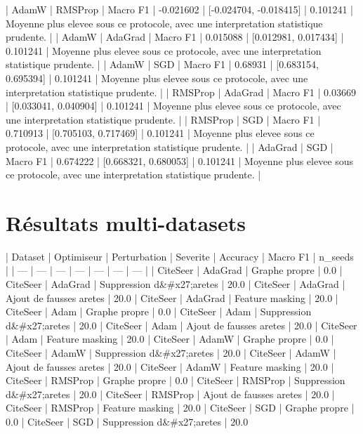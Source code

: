 \documentclass[11pt,a4paper]{article}
\begin{document}
| AdamW | RMSProp | Macro F1 | -0.021602 | [-0.024704, -0.018415] | 0.101241 | Moyenne plus elevee sous ce protocole, avec une interpretation statistique prudente. |
| AdamW | AdaGrad | Macro F1 | 0.015088 | [0.012981, 0.017434] | 0.101241 | Moyenne plus elevee sous ce protocole, avec une interpretation statistique prudente. |
| AdamW | SGD | Macro F1 | 0.68931 | [0.683154, 0.695394] | 0.101241 | Moyenne plus elevee sous ce protocole, avec une interpretation statistique prudente. |
| RMSProp | AdaGrad | Macro F1 | 0.03669 | [0.033041, 0.040904] | 0.101241 | Moyenne plus elevee sous ce protocole, avec une interpretation statistique prudente. |
| RMSProp | SGD | Macro F1 | 0.710913 | [0.705103, 0.717469] | 0.101241 | Moyenne plus elevee sous ce protocole, avec une interpretation statistique prudente. |
| AdaGrad | SGD | Macro F1 | 0.674222 | [0.668321, 0.680053] | 0.101241 | Moyenne plus elevee sous ce protocole, avec une interpretation statistique prudente. |
\par
\section{Résultats multi-datasets}
\par
| Dataset | Optimiseur | Perturbation | Severite | Accuracy | Macro F1 | n_seeds |
| --- | --- | --- | --- | --- | --- | --- |
| CiteSeer | AdaGrad | Graphe propre | 0.0%
| CiteSeer | AdaGrad | Suppression d&#x27;aretes | 20.0%
| CiteSeer | AdaGrad | Ajout de fausses aretes | 20.0%
| CiteSeer | AdaGrad | Feature masking | 20.0%
| CiteSeer | Adam | Graphe propre | 0.0%
| CiteSeer | Adam | Suppression d&#x27;aretes | 20.0%
| CiteSeer | Adam | Ajout de fausses aretes | 20.0%
| CiteSeer | Adam | Feature masking | 20.0%
| CiteSeer | AdamW | Graphe propre | 0.0%
| CiteSeer | AdamW | Suppression d&#x27;aretes | 20.0%
| CiteSeer | AdamW | Ajout de fausses aretes | 20.0%
| CiteSeer | AdamW | Feature masking | 20.0%
| CiteSeer | RMSProp | Graphe propre | 0.0%
| CiteSeer | RMSProp | Suppression d&#x27;aretes | 20.0%
| CiteSeer | RMSProp | Ajout de fausses aretes | 20.0%
| CiteSeer | RMSProp | Feature masking | 20.0%
| CiteSeer | SGD | Graphe propre | 0.0%
| CiteSeer | SGD | Suppression d&#x27;aretes | 20.0%
\par
\end{document}
